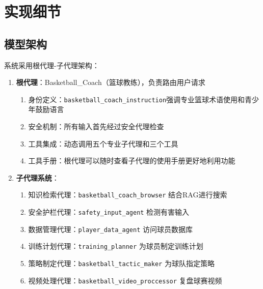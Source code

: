 \documentclass{article}
\theoremstyle{plain}
\theoremstyle{definition}
\theoremstyle{remark}
\begin{document}
\section{实现细节}

\subsection{模型架构}
系统采用根代理-子代理架构：
\begin{enumerate}
    \item \textbf{根代理}：Basketball\_Coach（篮球教练），负责路由用户请求
    \begin{enumerate}
        \item 身份定义：\texttt{basketball\_coach\_instruction}强调专业篮球术语使用和青少年鼓励语言
        \item 安全机制：所有输入首先经过安全代理检查
        \item 工具集成：动态调用五个专业子代理和三个工具
        \item 工具手册：根代理可以随时查看子代理的使用手册更好地利用功能
    \end{enumerate}
    
    \item \textbf{子代理系统}：
    \begin{enumerate}
        \item 知识检索代理：\texttt{basketball\_coach\_browser} 结合RAG进行搜索
        \item 安全护栏代理：\texttt{safety\_input\_agent} 检测有害输入
        \item 数据管理代理：\texttt{player\_data\_agent} 访问球员数据库
        \item 训练计划代理：\texttt{training\_planner} 为球员制定训练计划
        \item 策略制定代理：\texttt{basketball\_tactic\_maker} 为球队指定策略
        \item 视频处理代理：\texttt{basketball\_video\_proccessor} 复盘球赛视频
    \end{enumerate}
\end{enumerate}
\end{document}

